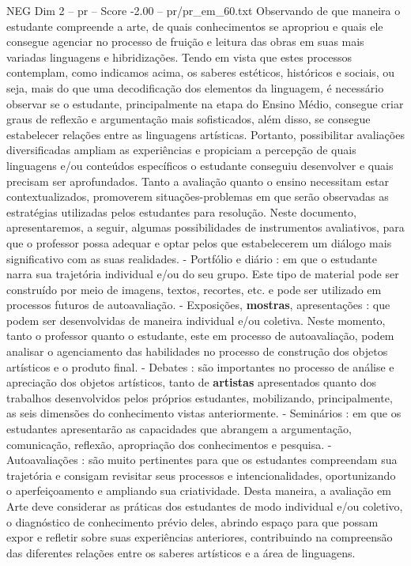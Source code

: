 \begin{textsample}{NEG Dim 2 – pr – Score -2.00 – pr/pr\_em\_60.txt}
Observando de que maneira o estudante compreende a arte, de quais conhecimentos se apropriou e quais ele consegue agenciar no processo de fruição e leitura das obras em suas mais variadas linguagens e hibridizações.
Tendo em vista que estes processos contemplam, como indicamos acima, os saberes estéticos, históricos e sociais, ou seja, mais do que uma decodificação dos elementos da linguagem, é necessário observar se o estudante, principalmente na etapa do Ensino Médio, consegue criar graus de reflexão e argumentação mais sofisticados, além disso, se consegue estabelecer relações entre as linguagens artísticas.
Portanto, possibilitar avaliações diversificadas ampliam as experiências e propiciam a percepção de quais linguagens e/ou conteúdos específicos o estudante conseguiu desenvolver e quais precisam ser aprofundados.
Tanto a avaliação quanto o ensino necessitam estar contextualizados, promoverem situações-problemas em que serão observadas as estratégias utilizadas pelos estudantes para resolução.
Neste documento, apresentaremos, a seguir, algumas possibilidades de instrumentos avaliativos, para que o professor possa adequar e optar pelos que estabelecerem um diálogo mais significativo com as suas realidades. - Portfólio e diário : em que o estudante narra sua trajetória individual e/ou do seu grupo.
Este tipo de material pode ser construído por meio de imagens, textos, recortes, etc. e pode ser utilizado em processos futuros de autoavaliação. - Exposições, \textbf{mostras}, apresentações : que podem ser desenvolvidas de maneira individual e/ou coletiva.
Neste momento, tanto o professor quanto o estudante, este em processo de autoavaliação, podem analisar o agenciamento das habilidades no processo de construção dos objetos artísticos e o produto final. - Debates : são importantes no processo de análise e apreciação dos objetos artísticos, tanto de \textbf{artistas} apresentados quanto dos trabalhos desenvolvidos pelos próprios estudantes, mobilizando, principalmente, as seis dimensões do conhecimento vistas anteriormente. - Seminários : em que os estudantes apresentarão as capacidades que abrangem a argumentação, comunicação, reflexão, apropriação dos conhecimentos e pesquisa. - Autoavaliações : são muito pertinentes para que os estudantes compreendam sua trajetória e consigam revisitar seus processos e intencionalidades, oportunizando o aperfeiçoamento e ampliando sua criatividade.
Desta maneira, a avaliação em Arte deve considerar as práticas dos estudantes de modo individual e/ou coletivo, o diagnóstico de conhecimento prévio deles, abrindo espaço para que possam expor e refletir sobre suas experiências anteriores, contribuindo na compreensão das diferentes relações entre os saberes artísticos e a área de linguagens.

\end{textsample}
